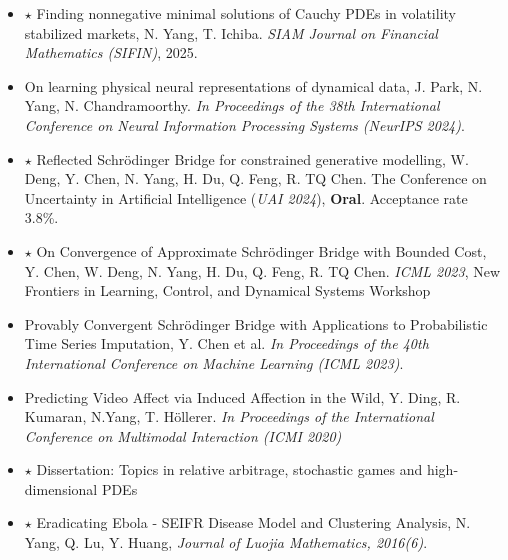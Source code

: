 \documentclass[11pt,a4paper,roman]{moderncv}
\begin{document}
\begin{itemize}
\vspace{5pt}
\item \textbf{$\star$} Finding nonnegative minimal solutions of Cauchy PDEs in volatility stabilized markets, N. Yang, T. Ichiba. \textit{SIAM Journal on Financial Mathematics (SIFIN)}, 2025.
\vspace{5pt}
\item On learning physical neural representations of dynamical data, J. Park, N. Yang, N. Chandramoorthy. \textit{In Proceedings of the 38th International Conference on Neural Information Processing Systems (NeurIPS 2024)}.
\vspace{5pt}
\item \textbf{$\star$} Reflected Schr\"{o}dinger Bridge for constrained generative modelling, W. Deng, Y. Chen, N. Yang, H. Du, Q. Feng, R. TQ Chen. The Conference on Uncertainty in Artificial Intelligence (\textit{UAI 2024}), \textbf{Oral}. Acceptance rate 3.8\%.
\vspace{5pt}
\item \textbf{$\star$} On Convergence of Approximate Schr\"{o}dinger Bridge with Bounded Cost, Y. Chen, W. Deng, N. Yang, H. Du, Q. Feng,  R. TQ Chen. \textit{ICML 2023}, New Frontiers in Learning, Control, and Dynamical Systems Workshop
\vspace{5pt}
\item Provably Convergent Schr\"{o}dinger Bridge with Applications to Probabilistic Time Series Imputation, Y. Chen et al. \textit{In Proceedings of the 40th International Conference on Machine Learning (ICML 2023)}. 
\vspace{5pt}
\item Predicting Video Affect via Induced
Affection in the Wild, Y. Ding, R. Kumaran, N.Yang, T. H\"ollerer. \textit{In Proceedings of the International Conference on Multimodal Interaction (ICMI 2020)} 
\vspace{5pt}
\item \textbf{$\star$} Dissertation: Topics in relative arbitrage, stochastic games and high-dimensional PDEs
\vspace{5pt}
\item \textbf{$\star$} Eradicating Ebola - SEIFR Disease Model and Clustering Analysis, N. Yang, Q. Lu, Y. Huang, \textit{Journal of Luojia Mathematics, 2016(6)}.
\vspace{5pt}
\end{itemize}
\end{document}
